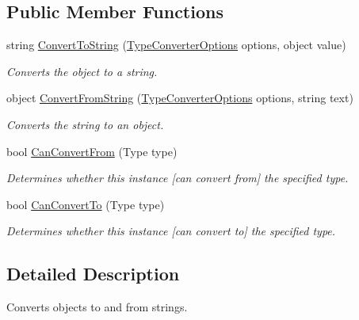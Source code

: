\subsection*{Public Member Functions}
\begin{DoxyCompactItemize}
\item 
string \hyperlink{a00099_a90c465c63dbcf913f38aa878f35e77c7}{Convert\-To\-String} (\hyperlink{a00154}{Type\-Converter\-Options} options, object value)
\begin{DoxyCompactList}\small\item\em Converts the object to a string. \end{DoxyCompactList}\item 
object \hyperlink{a00099_ab598e04c22e5a7890b6d21011492283e}{Convert\-From\-String} (\hyperlink{a00154}{Type\-Converter\-Options} options, string text)
\begin{DoxyCompactList}\small\item\em Converts the string to an object. \end{DoxyCompactList}\item 
bool \hyperlink{a00099_ae1ad863656f4fa96bd846a41344c9349}{Can\-Convert\-From} (Type type)
\begin{DoxyCompactList}\small\item\em Determines whether this instance \mbox{[}can convert from\mbox{]} the specified type. \end{DoxyCompactList}\item 
bool \hyperlink{a00099_a168b03dad37fcb6882101c93deac8111}{Can\-Convert\-To} (Type type)
\begin{DoxyCompactList}\small\item\em Determines whether this instance \mbox{[}can convert to\mbox{]} the specified type. \end{DoxyCompactList}\end{DoxyCompactItemize}


\subsection{Detailed Description}
Converts objects to and from strings. 



